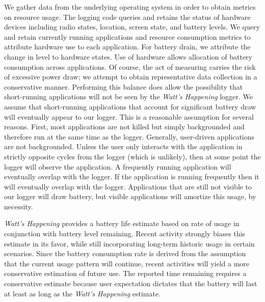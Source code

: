 We gather data from the underlying operating system in order to obtain metrics on resource usage.
The logging code queries and retains the status of hardware devices including radio states, location, screen state, and battery levels.
We query and retain currently running applications and resource consumption metrics to attribute hardware use to each application.
For battery drain, we attribute the change in level to hardware states.
Use of hardware allows allocation of battery consumption across applications.
Of course, the act of measuring carries the risk of excessive power draw; we attempt to obtain representative data collection in a conservative manner.
Performing this balance does allow the possibility that short-running applications will not be seen by the \emph{Watt's Happening} logger.
We assume that short-running applications that account for significant battery draw will eventually appear to our logger.
This is a reasonable assumption for several reasons.
First, most applications are not killed but simply backgrounded and therefore run at the same time as the logger.
Generally, user-driven applications are not backgrounded.
Unless the user only interacts with the application in strictly opposite cycles from the logger (which is unlikely), then at some point the logger will observe the application.
A frequently running application will eventually overlap with the logger.
If the application is running frequently then it will eventually overlap with the logger.
Applications that are still not visible to our logger will draw battery, but visible applications will amortize this usage, by necessity.

\emph{Watt's Happening} provides a battery life estimate based on rate of usage in conjunction with battery level remaining.
Recent activity strongly biases this estimate in its favor, while still incorporating long-term historic usage in certain scenarios.
Since the battery consumption rate is derived from the assumption that the current usage pattern will continue, recent activities will yield a more conservative estimation of future use.
The reported time remaining requires a conservative estimate because user expectation dictates that the battery will last at least as long as the \emph{Watt's Happening} estimate.


